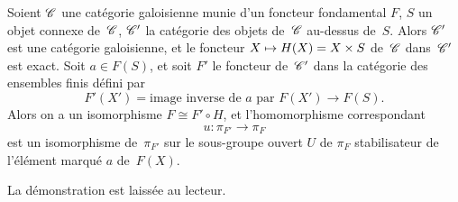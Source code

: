 \begin{proposition}
\label{V.6.13}
Soient $\cal{C}$ une cat\'egorie galoisienne munie d'un foncteur
fondamental $F$, $S$ un objet connexe de~$\cal{C}$, $\cal{C}'$ la
cat\'egorie des objets de~$\cal{C}$ au-dessus de~$S$. Alors
$\cal{C'}$ est une cat\'egorie galoisienne, et le foncteur $X\mto
H(X)=X\times S$ de~$\cal{C}$ dans~$\cal{C}'$ est exact. Soit $a\in
F(S)$, et soit $F'$ le foncteur de~$\cal{C}'$ dans la cat\'egorie
des ensembles finis d\'efini par
$$
F'(X')=\text{image inverse de~$a$ par }F(X')\to F(S).
$$
Alors on a un isomorphisme $F\cong F'\circ H$, et l'homomorphisme
correspondant
$$
u:\pi_{F'}\to \pi_F
$$
est un isomorphisme de~$\pi_{F'}$ sur le sous-groupe ouvert $U$ de
$\pi_{F}$ stabilisateur de l'\'el\'ement marqu\'e $a$ de~$F(X)$.
\end{proposition}

La d\'emonstration est laiss\'ee au lecteur.

